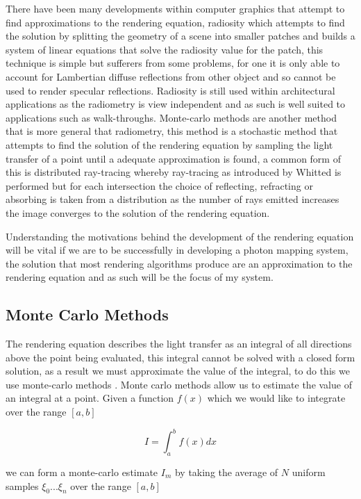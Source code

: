 There have been many developments within computer graphics that attempt to find approximations
to the rendering equation, radiosity \cite{Goral85}which attempts to find the solution by splitting 
the geometry of a scene into smaller patches and builds a system of linear equations that solve the 
radiosity value for the patch, this technique is simple but sufferers from some problems, for one it 
is only able to account for Lambertian diffuse reflections from other object and so cannot be used
to render specular reflections. Radiosity is still used within architectural applications as the
radiometry is view independent and as such is well suited to applications such as walk-throughs.
Monte-carlo methods are another method that is more general that radiometry, this method is a
stochastic method that attempts to find the solution of the rendering equation by sampling the light
transfer of a point until a adequate approximation is found, a common form of this is distributed
ray-tracing whereby ray-tracing as introduced by Whitted \cite{whitted79a} is performed but for each
intersection the choice of reflecting, refracting or absorbing is taken from a distribution as the
number of rays emitted increases the image converges to the solution of the rendering equation.

Understanding the motivations behind the development of the rendering equation will be vital if we are to be successfully in
developing a photon mapping system, the solution that most rendering algorithms produce are an
approximation to the rendering equation and as such will be the focus of my system.

\subsection{Monte Carlo Methods}
The rendering equation describes the light transfer as an integral of all directions above the point being evaluated, this
integral cannot be solved with a closed form solution, as a result we must approximate the value of the integral, to do this
we use monte-carlo methods \cite{wood-monte-carlo}. Monte carlo methods allow us to estimate the value of an integral at a point.
Given a function $f(x)$ which we would like to integrate over the range $[a, b]$

\begin{equation}
I = \int_a^b f(x) dx
\end{equation}

we can form a monte-carlo estimate $I_m$ by taking the average of $N$ uniform samples $\xi_0 ... \xi_n$ over the range $[a, b]$

